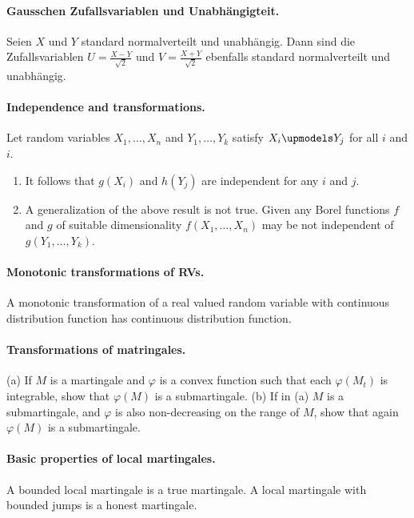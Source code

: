 


\paragraph{Gausschen Zufallsvariablen und Unabhängigteit. } Seien $X$ und $Y$ standard normalverteilt 
und unabhängig. Dann sind die Zufallsvariablen $U = \frac{X-Y}{\sqrt{2}}$ und $V=\frac{X+Y}{\sqrt{2}}$
ebenfalls standard normalverteilt und unabhängig. 


\paragraph{Independence and transformations. } Let random variables $X_1,\ldots,X_n$ and
$Y_1,\ldots,Y_k$ satisfy $X_i \upmodels Y_j$ for all $i$ and $i$.
\begin{enumerate}
    \item It follows that $g(X_i)$ and $h(Y_j)$ are independent for any $i$ and $j$.
    \item A generalization of the above result is not true. Given
any Borel functions $f$ and $g$ of suitable dimensionality 
$f(X_1,\ldots,X_n)$ may be not independent of $g(Y_1,\ldots,Y_k)$.
\end{enumerate}


\paragraph{Monotonic transformations of RVs. }   A monotonic transformation of a real
valued random variable with continuous distribution function has continuous
distribution function. 


\paragraph{Transformations of matringales.} (a) If $M$ is a martingale and
$\varphi$ is a convex function such that each $\varphi(M_t)$ is integrable,
show that $\varphi(M)$ is a submartingale.  (b) If in (a) $M$ is a submartingale,
and $\varphi$ is also non-decreasing on the range of $M$, show that again $\varphi(M)$ is a
submartingale.


\paragraph{Basic properties of local martingales. } A bounded local martingale is a 
true martingale. A local martingale with bounded jumps is a honest martingale.


